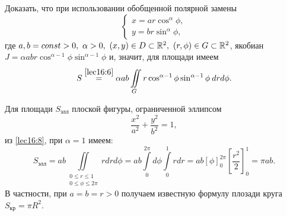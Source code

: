 \documentclass[../../main.tex]{subfiles}
\begin{document}
\begin{exercise}
	Доказать, что при использовании обобщенной полярной замены
	\begin{equation*}
	\begin{cases}
	x=ar\cos^\alpha\phi,\\
	y=br\sin^\alpha\phi,
	\end{cases}
	\end{equation*}
	где $
	a,b=const>0,\
	\alpha>0,\ (x,y)\in D \subset \mathbb{R}^2,\ (r,\phi)\in G\subset \mathbb{R}^2$,
	якобиан $J=\alpha a b r \cos^{\alpha-1}\phi\sin^{\alpha-1}\phi$ и, значит, 
	для 
	площади имеем
	\begin{equation}
	\label{lec16:8}
	S \overset{\eqref{lec16:6}}{=} \alpha a b \iint\limits_G r\cos^{\alpha - 
	1}\phi
	\sin^{\alpha - 1}\phi \: dr d\phi.
	\end{equation}
\end{exercise}
	\begin{example}
	Для площади $S_{\text{элл}}$ плоской фигуры, ограниченной эллипсом
	\begin{equation*}
	\dfrac{x^2}{a^2} + \dfrac{y^2}{b^2} = 1,
	\end{equation*}
	из \eqref{lec16:8}, при
	$ \alpha = 1 $ имеем:
	\begin{equation*}
	S_{\text{элл}} = 
	ab\iint\limits_
	{\substack{
		0\leq r\leq1\\
		0\leq \phi \leq 2\pi
	}} rdrd \phi =
	ab \int\limits_0^{2\pi}d\phi\int\limits_0^1rdr =
	ab \left[\phi \right]^{2\pi}_0
	\left[\dfrac{r^2}{2}\right]_0^1 = \pi ab.
	\end{equation*}
	В частности, при $a = b = r > 0$ получаем известную формулу плозади круга 
	$S_{\text{кр}} = \pi R^2$.
\end{example}
\end{document}
